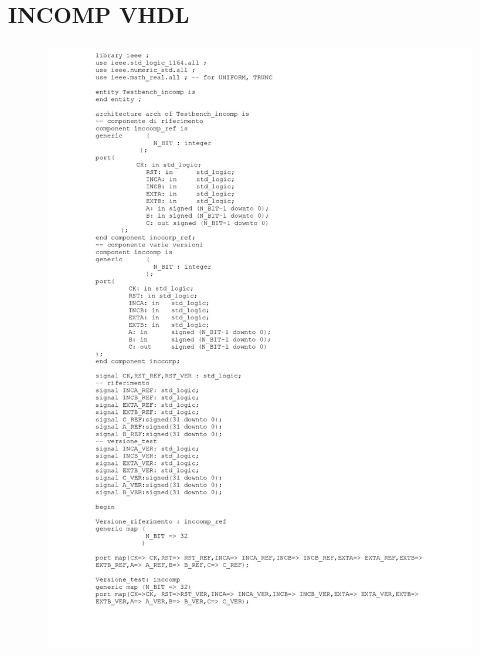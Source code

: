 \subsection{INCOMP VHDL}
\begin{figure}[!htb]
	\centering
	\includegraphics[scale=0.25]{immagini/testbench_vhdl1}
	\label{testbench_vhdl1}
\end{figure}
